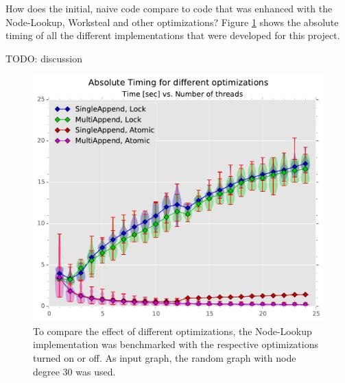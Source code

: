 How does the initial, naive code compare to code that was enhanced with the Node-Lookup, Worksteal and other optimizations?
Figure \ref{fig:abstiming} shows the absolute timing of all the different implementations that were developed for this project.
\par\medskip
{\Large TODO: discussion}
\par\medskip
%
\begin{figure}[ht]
	\centering
	\includegraphics[width=\columnwidth]{plots/abstiming_gtRANDOMLIN_n1000000_deg30.pdf}
	\caption{To compare the effect of different optimizations, the Node-Lookup implementation was benchmarked with the respective optimizations turned on or off.
	As input graph, the random graph with node degree 30 was used.}
	\label{fig:abstiming}
\end{figure}


